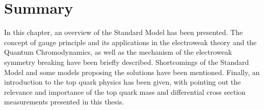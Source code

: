 \section{Summary}
In this chapter, an overview of the Standard Model has been presented. The concept of gauge principle and its
applications in the electroweak theory and the Quantum Chromodynamics, as well as the mechanism of the electroweak
symmetry breaking have been briefly described. Shortcomings of the Standard Model and some models proposing the
solutions have been mentioned. Finally, an introduction to the top quark physics has been given, with pointing out the
relevance and importance of the top quark mass and differential cross section measurements presented in this thesis.

